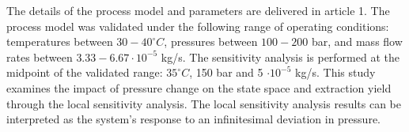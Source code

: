 \documentclass[../Article_Sensitivity_Analsysis.tex]{subfiles}
\begin{document}
	
	\label{CH: Results}
	
	The details of the process model and parameters are delivered in {\color{red}article 1}. The process model was validated under the following range of operating conditions: temperatures between $30 - 40^\circ C$, pressures between $100 - 200$ bar, and mass flow rates between $3.33-6.67 \cdot 10^{-5}$ kg/s. The sensitivity analysis is performed at the midpoint of the validated range: $35^\circ C$, 150 bar and 5 $\cdot 10^{-5}$ kg/s. This study examines the impact of pressure change on the state space and extraction yield through the local sensitivity analysis. The local sensitivity analysis results can be interpreted as the system's response to an infinitesimal deviation in pressure.
	
        
    
    
	
\end{document}
